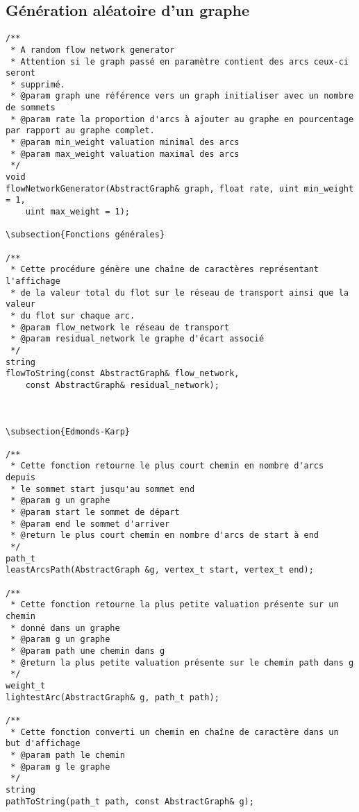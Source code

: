 \subsection{Génération aléatoire d'un graphe}

\begin{verbatim}
/**
 * A random flow network generator
 * Attention si le graph passé en paramètre contient des arcs ceux-ci seront
 * supprimé.
 * @param graph une référence vers un graph initialiser avec un nombre de sommets
 * @param rate la proportion d'arcs à ajouter au graphe en pourcentage par rapport au graphe complet.
 * @param min_weight valuation minimal des arcs
 * @param max_weight valuation maximal des arcs
 */
void
flowNetworkGenerator(AbstractGraph& graph, float rate, uint min_weight = 1,
    uint max_weight = 1);

\subsection{Fonctions générales}

/**
 * Cette procédure génère une chaîne de caractères représentant l'affichage
 * de la valeur total du flot sur le réseau de transport ainsi que la valeur
 * du flot sur chaque arc.
 * @param flow_network le réseau de transport
 * @param residual_network le graphe d'écart associé
 */
string
flowToString(const AbstractGraph& flow_network,
    const AbstractGraph& residual_network);



\subsection{Edmonds-Karp}

/**
 * Cette fonction retourne le plus court chemin en nombre d'arcs depuis
 * le sommet start jusqu'au sommet end
 * @param g un graphe
 * @param start le sommet de départ
 * @param end le sommet d'arriver
 * @return le plus court chemin en nombre d'arcs de start à end
 */
path_t
leastArcsPath(AbstractGraph &g, vertex_t start, vertex_t end);

/**
 * Cette fonction retourne la plus petite valuation présente sur un chemin 
 * donné dans un graphe
 * @param g un graphe
 * @param path une chemin dans g
 * @return la plus petite valuation présente sur le chemin path dans g 
 */
weight_t
lightestArc(AbstractGraph& g, path_t path);

/**
 * Cette fonction converti un chemin en chaîne de caractère dans un but d'affichage
 * @param path le chemin
 * @param g le graphe
 */
string
pathToString(path_t path, const AbstractGraph& g);


\end{verbatim}
